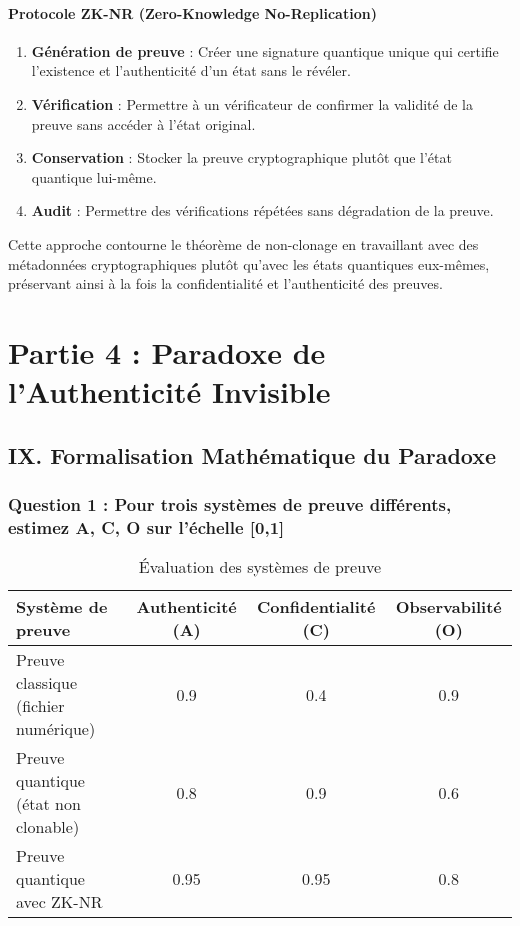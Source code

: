\documentclass[12pt, a4paper]{article}
\begin{document}
		\paragraph{Protocole ZK-NR (Zero-Knowledge No-Replication)}
		\begin{enumerate}
			\item \textbf{Génération de preuve} : Créer une signature quantique unique qui certifie l'existence et l'authenticité d'un état sans le révéler.
			\item \textbf{Vérification} : Permettre à un vérificateur de confirmer la validité de la preuve sans accéder à l'état original.
			\item \textbf{Conservation} : Stocker la preuve cryptographique plutôt que l'état quantique lui-même.
			\item \textbf{Audit} : Permettre des vérifications répétées sans dégradation de la preuve.
		\end{enumerate}
		
		Cette approche contourne le théorème de non-clonage en travaillant avec des métadonnées cryptographiques plutôt qu'avec les états quantiques eux-mêmes, préservant ainsi à la fois la confidentialité et l'authenticité des preuves.
		
		\section*{Partie 4 : Paradoxe de l'Authenticité Invisible}
		
		\subsection*{IX. Formalisation Mathématique du Paradoxe}
		
		\subsubsection*{Question 1 : Pour trois systèmes de preuve différents, estimez A, C, O sur l'échelle [0,1]}
		
		\begin{table}[H]
			\centering
			\begin{tabular}{|p{5cm}|c|c|c|}
				\hline
				\textbf{Système de preuve} & \textbf{Authenticité (A)} & \textbf{Confidentialité (C)} & \textbf{Observabilité (O)} \\
				\hline
				Preuve classique (fichier numérique) & 0.9 & 0.4 & 0.9 \\
				\hline
				Preuve quantique (état non clonable) & 0.8 & 0.9 & 0.6 \\
				\hline
				Preuve quantique avec ZK-NR & 0.95 & 0.95 & 0.8 \\
				\hline
			\end{tabular}
			\caption{Évaluation des systèmes de preuve}
		\end{table}
		
\end{document}
